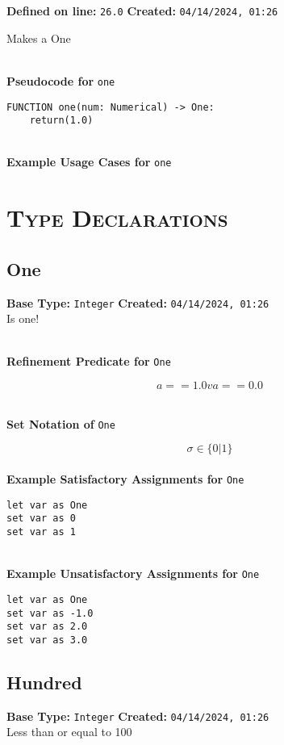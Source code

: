 \documentclass{article}
\begin{document}
\textbf{Defined on line:} \verb|26.0| \hfill \textbf{Created:} \verb|04/14/2024, 01:26| 


Makes a One

\textbf{\\ Pseudocode for } \texttt{one}
\begin{verbatim}
FUNCTION one(num: Numerical) -> One:
	return(1.0)
\end{verbatim}

\textbf{\\ Example Usage Cases for } \texttt{one}
\clearpage

\section{\textsc{Type Declarations}}

\subsection{One}
\textbf{Base Type:} \verb|Integer| \hfill \textbf{Created:} \verb|04/14/2024, 01:26| \\
Is one!

\textbf{\\ Refinement Predicate for } \texttt{One}

$$ a == 1.0 v a == 0.0 $$

\textbf{\\ Set Notation of } \texttt{One}

$$\sigma \in \{ 0 | 1 \}$$ \ \
\textbf{\\ Example Satisfactory Assignments for } \texttt{One}
\begin{verbatim}
let var as One
set var as 0
set var as 1
\end{verbatim}


\textbf{\\ Example Unsatisfactory Assignments for } \texttt{One}
\begin{verbatim}
let var as One
set var as -1.0
set var as 2.0
set var as 3.0
\end{verbatim}


\clearpage

\subsection{Hundred}
\textbf{Base Type:} \verb|Integer| \hfill \textbf{Created:} \verb|04/14/2024, 01:26| \\
Less than or equal to 100
\end{document}
